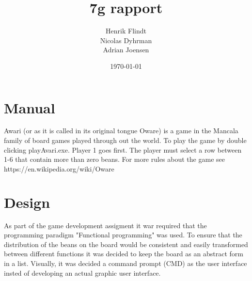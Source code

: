 \documentclass{article}
\title{7g rapport}
\author{Henrik Flindt\\Nicolas Dyhrman\\Adrian Joensen}
\date{\today}
\begin{document}
    \maketitle
    \section{Manual}
    Awari (or as it is called in its original tongue Oware) is a game in the Mancala family of board games played through out the world. To play the game by double clicking playAvari.exe. Player 1 goes first. The player must select a row between 1-6 that contain more than zero beans. For more rules about the game see https://en.wikipedia.org/wiki/Oware
    
    \section{Design}
        As part of the game development assigment it war required that the programming paradigm "Functional programming" was used. To ensure that the distribution of the beans on the board would be consistent and easily transformed between different functions it was decided to keep the board as an abstract form in a list. 
        Visually, it was decided a command prompt (CMD) as the user interface insted of developing an actual graphic user interface. 
        
\end{document}
